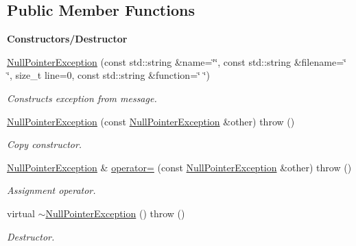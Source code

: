 \subsection*{Public Member Functions}
\begin{Indent}{\bf Constructors/\+Destructor}\par
\begin{DoxyCompactItemize}
\item 
\hyperlink{classNullPointerException_ac582ad9b8b3b1a7e5086eddc51f45341}{Null\+Pointer\+Exception} (const std\+::string \&name=\char`\"{}\char`\"{}, const std\+::string \&filename=\char`\"{} \char`\"{}, size\+\_\+t line=0, const std\+::string \&function=\char`\"{} \char`\"{})\hypertarget{classNullPointerException_ac582ad9b8b3b1a7e5086eddc51f45341}{}\label{classNullPointerException_ac582ad9b8b3b1a7e5086eddc51f45341}

\begin{DoxyCompactList}\small\item\em Constructs exception from message. \end{DoxyCompactList}\item 
\hyperlink{classNullPointerException_a7ec1e957cb13533582034e08971ce739}{Null\+Pointer\+Exception} (const \hyperlink{classNullPointerException}{Null\+Pointer\+Exception} \&other)  throw ()\hypertarget{classNullPointerException_a7ec1e957cb13533582034e08971ce739}{}\label{classNullPointerException_a7ec1e957cb13533582034e08971ce739}

\begin{DoxyCompactList}\small\item\em Copy constructor. \end{DoxyCompactList}\item 
\hyperlink{classNullPointerException}{Null\+Pointer\+Exception} \& \hyperlink{classNullPointerException_a77345c84b84d5d79be16b3c987a54155}{operator=} (const \hyperlink{classNullPointerException}{Null\+Pointer\+Exception} \&other)  throw ()\hypertarget{classNullPointerException_a77345c84b84d5d79be16b3c987a54155}{}\label{classNullPointerException_a77345c84b84d5d79be16b3c987a54155}

\begin{DoxyCompactList}\small\item\em Assignment operator. \end{DoxyCompactList}\item 
virtual \hyperlink{classNullPointerException_a94d055526c67a34ba55d7bf8bf108adb}{$\sim$\+Null\+Pointer\+Exception} ()  throw ()\hypertarget{classNullPointerException_a94d055526c67a34ba55d7bf8bf108adb}{}\label{classNullPointerException_a94d055526c67a34ba55d7bf8bf108adb}

\begin{DoxyCompactList}\small\item\em Destructor. \end{DoxyCompactList}\end{DoxyCompactItemize}
\end{Indent}
